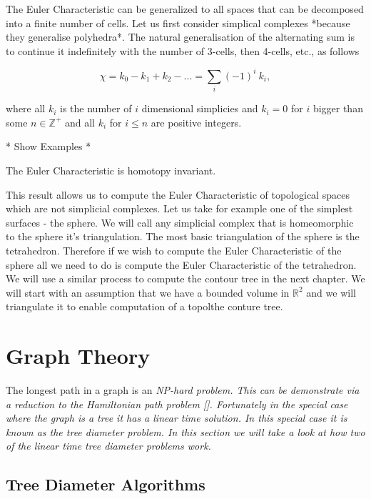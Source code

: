 The Euler Characteristic can be generalized to all spaces that can be decomposed into a finite number of cells. Let us first consider simplical complexes *because they generalise polyhedra*. The natural generalisation of the alternating sum is to continue it indefinitely with the number of 3-cells, then 4-cells, etc., as follows

$$ \chi = k_0 - k_1 + k_2 - ... = \sum_{i}{(-1)^i~k_i}, $$

where all $k_i$ is the number of $i$ dimensional simplicies and $k_i = 0$ for $i$ bigger than some $n \in \mathbb{Z}^+$ and all $k_i$ for $i \le n$ are positive integers.

* Show Examples *

\begin{lem}   The Euler Characteristic is homotopy invariant. \end{lem}

This result allows us to compute the Euler Characteristic of topological spaces which are not simplicial complexes. Let us take for example one of the simplest surfaces - the sphere. We will call any simplicial complex that is homeomorphic to the sphere it's triangulation. The most basic triangulation of the sphere is the tetrahedron. Therefore if we wish to compute the Euler Characteristic of the sphere all we need to do is compute the Euler Characteristic of the tetrahedron. We will use a similar process to compute the contour tree in the next chapter. We will start with an assumption that we have a bounded volume in $\mathbb{R}^2$ and we will triangulate it to enable computation of a topolthe conture tree.

\section{Graph Theory}

The longest path in a graph is an \em NP-hard \em problem. This can be demonstrate via a reduction to the Hamiltonian path problem []. Fortunately in the special case where the graph is a tree it has a linear time solution. In this special case it is known as the tree diameter problem. In this section we will take a look at how two of the linear time tree diameter problems work.


\subsection{Tree Diameter Algorithms}

